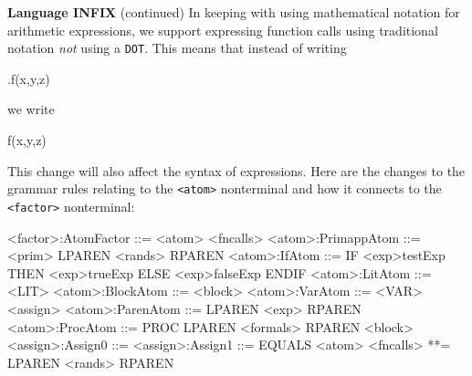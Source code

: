\begin{minipage}[t]{\sw}
\slidenumber
\LARGE
{\bf Language INFIX} (continued)\exx
In keeping with using mathematical notation
for arithmetic expressions, we support expressing function calls
using traditional notation {\em not} using a \verb'DOT'.
This means that instead of writing
{\Large
\begin{qv}
.f(x,y,z)
\end{qv}
}
we write
{\Large
\begin{qv}
f(x,y,z)
\end{qv}
}
This change will also affect the syntax of expressions.\exx
Here are the changes to the grammar rules relating
to the \verb'<atom>' nonterminal and how it connects
to the \verb'<factor>' nonterminal:
{\large
\begin{qv}
<factor>:AtomFactor ::= <atom> <fncalls>
<atom>:PrimappAtom  ::= <prim> LPAREN <rands> RPAREN
<atom>:IfAtom       ::= IF <exp>testExp THEN <exp>trueExp ELSE <exp>falseExp ENDIF
<atom>:LitAtom      ::= <LIT>
<atom>:BlockAtom    ::= <block>
<atom>:VarAtom      ::= <VAR> <assign>
<atom>:ParenAtom    ::= LPAREN <exp> RPAREN
<atom>:ProcAtom     ::= PROC LPAREN <formals> RPAREN <block>
<assign>:Assign0    ::=
<assign>:Assign1    ::= EQUALS <atom>
<fncalls>           **= LPAREN <rands> RPAREN
\end{qv}
}
\end{minipage}
